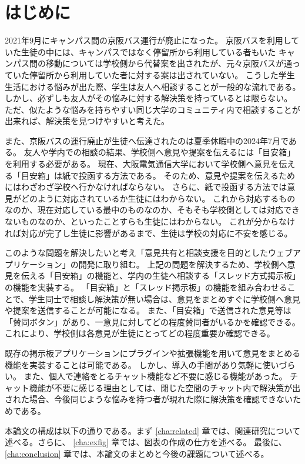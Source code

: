 \documentclass[main]{subfiles}
\begin{document}
\chapter{はじめに}
\label{cha:intro}

2021年9月にキャンパス間の京阪バス運行が廃止になった。
京阪バスを利用していた生徒の中には、キャンパスではなく停留所から利用している者もいた
キャンパス間の移動については学校側から代替案を出されたが、元々京阪バスが通っていた停留所から利用していた者に対する案は出されていない。
こうした学生生活における悩みが出た際、学生は友人へ相談することが一般的な流れである。
しかし、必ずしも友人がその悩みに対する解決策を持っているとは限らない。
ただ、似たような悩みを持ちやすい同じ大学のコミュニティ内で相談することが出来れば、解決策を見つけやすいと考えた。

また、京阪バスの運行廃止が生徒へ伝達されたのは夏季休暇中の2024年7月である。
友人や学内での相談の結果、学校側へ意見や提案を伝えるには「目安箱」を利用する必要がある。
現在、大阪電気通信大学において学校側へ意見を伝える「目安箱」は紙で投函する方法である。
そのため、意見や提案を伝えるためにはわざわざ学校へ行かなければならない。
さらに、紙で投函する方法では意見がどのように対応されているか生徒にはわからない。
これから対応するものなのか、現在対応している最中のものなのか、そもそも学校側としては対応できないものなのか、といったことすらも生徒にはわからない。
これが分からなければ対応が完了し生徒に影響があるまで、生徒は学校の対応に不安を感じる。

このような問題を解決したいと考え「意見共有と相談支援を目的としたウェブアプリケーション」の開発に取り組む。
上記の問題を解決するため、学校側へ意見を伝える「目安箱」の機能と、学内の生徒へ相談する「スレッド方式掲示板」の機能を実装する。
「目安箱」と「スレッド掲示板」の機能を組み合わせることで、学生同士で相談し解決策が無い場合は、意見をまとめすぐに学校側へ意見や提案を送信することが可能になる。
また、「目安箱」で送信された意見等は「賛同ボタン」があり、一意見に対してどの程度賛同者がいるかを確認できる。
これにより、学校側は各意見が生徒にとってどの程度重要か確認できる。

既存の掲示板アプリケーションにプラグインや拡張機能を用いて意見をまとめる機能を実装することは可能である。
しかし、導入の手間があり気軽に使いづらい。
また、個人で連絡をとるチャット機能など不要に感じる機能があった。
チャット機能が不要に感じる理由としては、閉じた空間のチャット内で解決策が出された場合、今後同じような悩みを持つ者が現れた際に解決策を確認できないためである。

本論文の構成は以下の通りである。まず \ref{cha:related} 章では、関連研究について述べる。さらに、
\ref{cha:exfig} 章では、図表の作成の仕方を述べる。
最後に、\ref{cha:conclusion} 章では、本論文のまとめと今後の課題について述べる。
\end{document}
